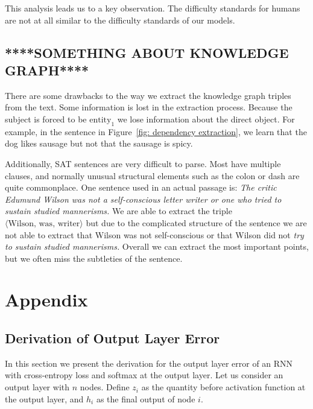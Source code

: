 \documentclass[pageno]{jpaper}
\begin{document}
This analysis leads us to a key observation. The difficulty standards for humans
are not at all similar to the difficulty standards of our models. 

\subsection{****SOMETHING ABOUT KNOWLEDGE GRAPH****}
\label{****SOMETHING ABOUT KNOWLEDGE GRAPH****}

There are some drawbacks to the way we extract the knowledge graph triples from
the text. Some information is lost in the extraction process. Because the
subject is forced to be $\text{entity}_1$ we lose information about the direct
object. For example, in the sentence in Figure~\ref{fig: dependency extraction},
we learn that the dog likes sausage but not that the sausage is spicy.

Additionally, SAT sentences are very difficult to parse. Most have multiple
clauses, and normally unusual structural elements such as the colon or dash are
quite commonplace. One sentence used in an actual passage is: \textit{The critic
Edumund Wilson was not a self-conscious letter writer or one who tried to
sustain studied mannerisms.} We are able to extract the triple $\langle
\text{Wilson}, \,\text{was}, \,\text{writer} \rangle$ but due to the complicated
structure of the sentence we are not able to extract that Wilson was not
self-conscious or that Wilson did not \textit{try to sustain studied
mannerisms.} Overall we can extract the most important points, but we often miss
the subtleties of the sentence.

\newpage
{}


\newpage

\section{Appendix}
\label{Appendix}

\subsection{Derivation of Output Layer Error}
\label{Derivation of Output Layer Error}

In this section we present the derivation for the output layer error of an RNN
with cross-entropy loss and softmax at the output layer. Let us consider an
output layer with $n$ nodes. Define $z_i$ as the quantity before activation
function at the output layer, and $h_i$ as the final output of node $i$.
\end{document}
